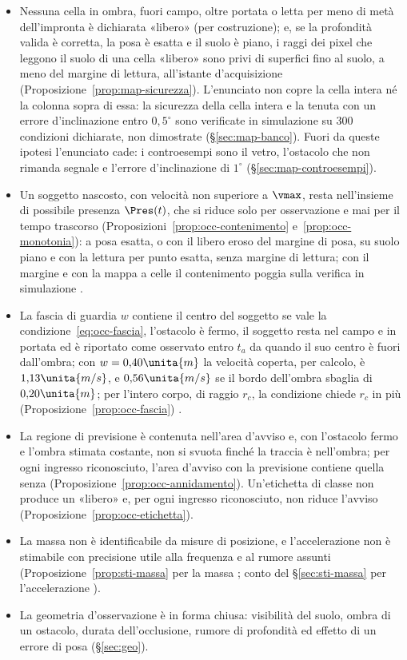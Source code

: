 \begin{itemize}
\item Nessuna cella in ombra, fuori campo, oltre portata o letta per meno di metà dell'impronta è dichiarata «libero» (per costruzione); e, se la profondità valida è corretta, la posa è esatta e il suolo è piano, i raggi dei pixel che leggono il suolo di una cella «libero» sono privi di superfici fino al suolo, a meno del margine di lettura, all'istante d'acquisizione (Proposizione~\ref{prop:map-sicurezza}). L'enunciato non copre la cella intera né la colonna sopra di essa: la sicurezza della cella intera e la tenuta con un errore d'inclinazione entro $0{,}5^\circ$ sono verificate in simulazione su 300 condizioni dichiarate, non dimostrate  (\S\ref{sec:map-banco}). Fuori da queste ipotesi l'enunciato cade: i controesempi sono il vetro, l'ostacolo che non rimanda segnale e l'errore d'inclinazione di $1^\circ$ (\S\ref{sec:map-controesempi}).
\item Un soggetto nascosto, con velocità non superiore a $\vmax$, resta nell'insieme di possibile presenza $\Pres(t)$, che si riduce solo per osservazione e mai per il tempo trascorso (Proposizioni~\ref{prop:occ-contenimento} e~\ref{prop:occ-monotonia}): a posa esatta, o con il libero eroso del margine di posa, su suolo piano e con la lettura per punto esatta, senza margine di lettura; con il margine e con la mappa a celle il contenimento poggia sulla verifica in simulazione .
\item La fascia di guardia $w$ contiene il centro del soggetto se vale la condizione~\eqref{eq:occ-fascia}, l'ostacolo è fermo, il soggetto resta nel campo e in portata ed è riportato come osservato entro $t_a$ da quando il suo centro è fuori dall'ombra; con $w=0{,}40\unita{m}$ la velocità coperta, per calcolo, è $1{,}13\unita{m/s}$, e $0{,}56\unita{m/s}$ se il bordo dell'ombra sbaglia di $0{,}20\unita{m}$; per l'intero corpo, di raggio $r_c$, la condizione chiede $r_c$ in più (Proposizione~\ref{prop:occ-fascia}) .
\item La regione di previsione è contenuta nell'area d'avviso e, con l'ostacolo fermo e l'ombra stimata costante, non si svuota finché la traccia è nell'ombra; per ogni ingresso riconosciuto, l'area d'avviso con la previsione contiene quella senza (Proposizione~\ref{prop:occ-annidamento}). Un'etichetta di classe non produce un «libero» e, per ogni ingresso riconosciuto, non riduce l'avviso (Proposizione~\ref{prop:occ-etichetta}).
\item La massa non è identificabile da misure di posizione, e l'accelerazione non è stimabile con precisione utile alla frequenza e al rumore assunti (Proposizione~\ref{prop:sti-massa} per la massa ; conto del \S\ref{sec:sti-massa} per l'accelerazione ).
\item La geometria d'osservazione è in forma chiusa: visibilità del suolo, ombra di un ostacolo, durata dell'occlusione, rumore di profondità ed effetto di un errore di posa (\S\ref{sec:geo}).
\end{itemize}

